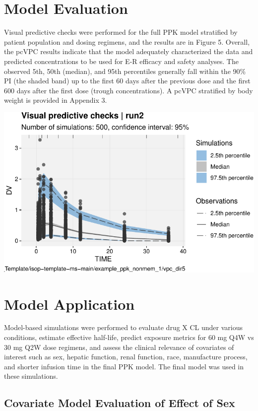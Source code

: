 \documentclass[
  letterpaper,
  toc=chapterentrywithdots,
  11pt,
  headings=small]{scrreprt}
\begin{document}
\section{Model Evaluation}\label{model-evaluation}

Visual predictive checks were performed for the full PPK model
stratified by patient population and dosing regimens, and the results
are in Figure 5. Overall, the pcVPC results indicate that the model
adequately characterized the data and predicted concentrations to be
used for E-R efficacy and safety analyses. The observed 5th, 50th
(median), and 95th percentiles generally fall within the 90\% PI (the
shaded band) up to the first 60 days after the previous dose and the
first 600 days after the first dose (trough concentrations). A pcVPC
stratified by body weight is provided in Appendix 3.

\includegraphics{sec/results_files/figure-pdf/unnamed-chunk-5-1.pdf}

\section{Model Application}\label{model-application}

Model-based simulations were performed to evaluate drug X CL under
various conditions, estimate effective half-life, predict exposure
metrics for 60 mg Q4W vs 30 mg Q2W dose regimens, and assess the
clinical relevance of covariates of interest such as sex, hepatic
function, renal function, race, manufacture process, and shorter
infusion time in the final PPK model. The final model was used in these
simulations.

\subsection{Covariate Model Evaluation of Effect of
Sex}\label{covariate-model-evaluation-of-effect-of-sex}
\end{document}
